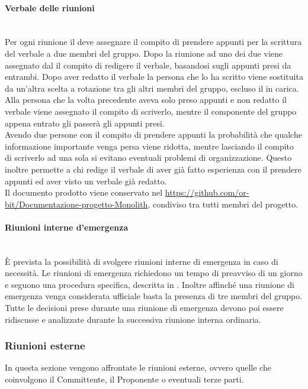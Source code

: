 \paragraph{Verbale delle riunioni}\label{sec:verbale_riunioni_interne}\mbox{}\\
Per ogni riunione il \Responsabile{} deve assegnare il compito di prendere appunti per la scrittura del verbale a due membri del gruppo. Dopo la riunione ad uno dei due viene assegnato dal \Responsabile{} il compito di redigere il verbale, basandosi sugli appunti presi da entrambi. 
Dopo aver redatto il verbale la persona che lo ha scritto viene sostituita da un’altra scelta a rotazione tra gli altri membri del gruppo, escluso il \Responsabile{} in carica. Alla persona che la volta precedente aveva solo preso appunti e non redatto il verbale viene assegnato il compito di scriverlo, mentre il componente del gruppo appena entrato gli passerà gli appunti presi.\\
Avendo due persone con il compito di prendere appunti la probabilità che qualche informazione importante venga persa viene ridotta, mentre lasciando il compito di scriverlo ad una sola si evitano eventuali problemi di organizzazione.
Questo inoltre permette a chi redige il verbale di aver già fatto esperienza con il prendere appunti ed aver visto un verbale già redatto.\\
Il documento prodotto viene conservato nel 
\sloppy \url{https://github.com/or-bit/Documentazione-progetto-Monolith}, condiviso tra tutti membri del progetto.

\paragraph{Riunioni interne d'emergenza}\label{sec:riunioni_emergenza}\mbox{}\\
\`{E} prevista la possibilità di svolgere riunioni interne di emergenza in caso di necessità. Le riunioni di emergenza richiedono un tempo di preavviso di un giorno e seguono una procedura specifica, descritta in . Inoltre affinché una riunione di emergenza venga considerata ufficiale basta la presenza di tre membri del gruppo.\\
Tutte le decisioni prese durante una riunione di emergenza devono poi essere ridiscusse e analizzate durante la successiva riunione interna ordinaria.

\subsubsection{Riunioni esterne}
In questa sezione vengono affrontate le riunioni esterne, ovvero quelle che coinvolgono il Committente, il Proponente o eventuali terze parti.

